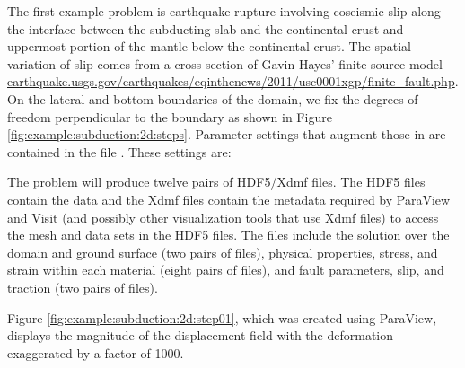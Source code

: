 The first example problem is earthquake rupture involving coseismic
slip along the interface between the subducting slab and the continental
crust and uppermost portion of the mantle below the continental crust.
The spatial variation of slip comes from a cross-section of Gavin
Hayes' finite-source model \url{earthquake.usgs.gov/earthquakes/eqinthenews/2011/usc0001xgp/finite_fault.php}.
On the lateral and bottom boundaries of the domain, we fix the degrees
of freedom perpendicular to the boundary as shown in Figure \vref{fig:example:subduction:2d:steps}.
Parameter settings that augment those in  are
contained in the file . These settings are:
\begin{inventory}
\end{inventory}

The problem will produce twelve pairs of HDF5/Xdmf files. The HDF5
files contain the data and the Xdmf files contain the metadata required
by ParaView and Visit (and possibly other visualization tools that
use Xdmf files) to access the mesh and data sets in the HDF5 files.
The files include the solution over the domain and ground surface
(two pairs of files), physical properties, stress, and strain within
each material (eight pairs of files), and fault parameters, slip,
and traction (two pairs of files). 

Figure \vref{fig:example:subduction:2d:step01}, which was created using
ParaView, displays the magnitude of the displacement field with the
deformation exaggerated by a factor of 1000. 


